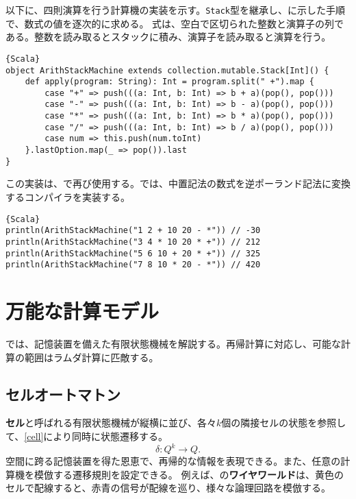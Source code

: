 \documentclass[10pt,a4paper]{book}
\begin{document}
以下に、四則演算を行う計算機の実装を示す。\texttt{Stack}型を継承し、に示した手順で、数式の値を逐次的に求める。
式は、空白で区切られた整数と演算子の列である。整数を読み取るとスタックに積み、演算子を読み取ると演算を行う。

\begin{Verbatim}{Scala}
object ArithStackMachine extends collection.mutable.Stack[Int]() {
	def apply(program: String): Int = program.split(" +").map {
		case "+" => push(((a: Int, b: Int) => b + a)(pop(), pop()))
		case "-" => push(((a: Int, b: Int) => b - a)(pop(), pop()))
		case "*" => push(((a: Int, b: Int) => b * a)(pop(), pop()))
		case "/" => push(((a: Int, b: Int) => b / a)(pop(), pop()))
		case num => this.push(num.toInt)
	}.lastOption.map(_ => pop()).last
}
\end{Verbatim}

この実装は、で再び使用する。では、中置記法の数式を逆ポーランド記法に変換するコンパイラを実装する。

\begin{Verbatim}{Scala}
println(ArithStackMachine("1 2 + 10 20 - *")) // -30
println(ArithStackMachine("3 4 * 10 20 * +")) // 212
println(ArithStackMachine("5 6 10 + 20 * +")) // 325
println(ArithStackMachine("7 8 10 * 20 - *")) // 420
\end{Verbatim}

\chapter{万能な計算モデル\label{chap:turing}}

では、記憶装置を備えた有限状態機械を解説する。再帰計算に対応し、可能な計算の範囲はラムダ計算に匹敵する。

\section{セルオートマトン\label{sect:cell}}

\textbf{セル}と呼ばれる有限状態機械が縦横に並び、各々$k$個の隣接セルの状態を参照して、\eqref{cell}により同時に状態遷移する。
%
\begin{equation}
\label{eq:cell}
\delta: Q^k \to Q.
\end{equation}
%
空間に跨る記憶装置を得た恩恵で、再帰的な情報を表現できる。また、任意の計算機を模倣する遷移規則を設定できる。
例えば、の\textbf{ワイヤワールド}は、黄色のセルで配線すると、赤青の信号が配線を巡り、様々な論理回路を模倣する。
\end{document}
